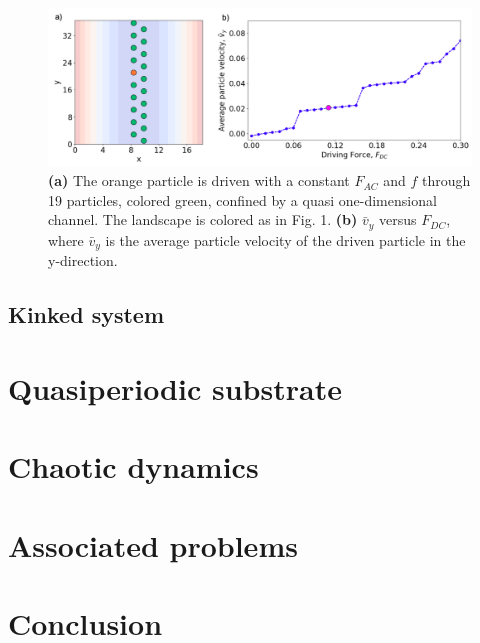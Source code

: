 \documentclass[prb,preprint]{revtex4}
\begin{document}
\begin{center}
\begin{figure}[h!]
\centering
\includegraphics[scale=.40]{twenty}
\caption{\textbf{(a)} The orange particle is driven with a constant $F_{AC}$ and $f$ through 19 particles, colored green, confined by a quasi one-dimensional channel. The landscape is colored as in Fig. 1. \textbf{(b)} $\bar{v}_{y}$ versus $F_{DC}$, where $\bar{v}_{y}$ is the average particle velocity of the driven particle in the y-direction.}
\end{figure}
\end{center}

\subsection{Kinked system}
\label{sec:static}	%




\section{Quasiperiodic substrate}
\label{sec:quasiperiod}	%

\section{Chaotic dynamics}
\label{sec:chaos}	%

\section{Associated problems}



\section{Conclusion}
\end{document}

